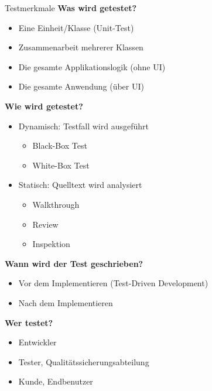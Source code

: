 \begin{corollary}{Testmerkmale}
\textbf{Was wird getestet?}
\begin{itemize}
    \item Eine Einheit/Klasse (Unit-Test)
    \item Zusammenarbeit mehrerer Klassen
    \item Die gesamte Applikationslogik (ohne UI)
    \item Die gesamte Anwendung (über UI)
\end{itemize}

\textbf{Wie wird getestet?}
\begin{itemize}
    \item Dynamisch: Testfall wird ausgeführt
    \begin{itemize}
        \item Black-Box Test
        \item White-Box Test
    \end{itemize}
    \item Statisch: Quelltext wird analysiert
    \begin{itemize}
        \item Walkthrough
        \item Review
        \item Inspektion
    \end{itemize}
\end{itemize}

\textbf{Wann wird der Test geschrieben?}
\begin{itemize}
    \item Vor dem Implementieren (Test-Driven Development)
    \item Nach dem Implementieren
\end{itemize}

\textbf{Wer testet?}
\begin{itemize}
    \item Entwickler
    \item Tester, Qualitätssicherungsabteilung
    \item Kunde, Endbenutzer
\end{itemize}
\end{corollary}


